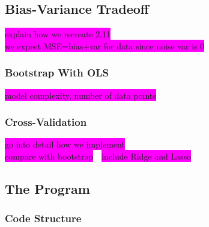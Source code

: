\documentclass[aps,pra,english,notitlepage,reprint,nofootinbib]{revtex4-1}  %
\begin{document}
\subsection{Bias-Variance Tradeoff}
\colorbox{magenta}{explain how we recreate 2.11} \\
\colorbox{magenta}{we expect MSE=bias+var for data since noise var is 0}

\subsubsection{Bootstrap With OLS}
\colorbox{magenta}{model complexity, number of data points}

\subsubsection{Cross-Validation}
\colorbox{magenta}{go into detail how we implement} \\
\colorbox{magenta}{compare with bootstrap}\ \
\colorbox{magenta}{include Ridge and Lasso}


\subsection{The Program}\label{subsec:program}
\subsubsection{Code Structure}\label{subsubsec:codestructure}
\end{document}
